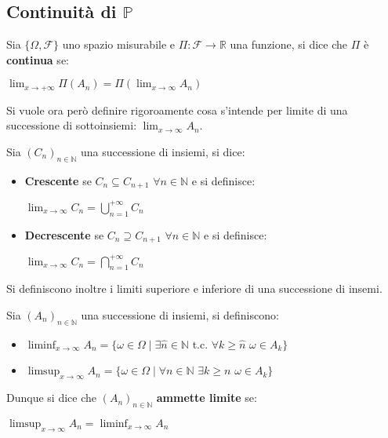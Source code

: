 \subsection{Continuità di $\mathbb{P}$}
\begin{definition}
Sia $\{\Omega, \mathscr{F}\}$ uno spazio misurabile e $\Pi:\mathscr{F}\longrightarrow\mathbb{R}$ una funzione, si dice che $\Pi$ è \textbf{continua} se:
\begin{center}
    $\lim_{x\to+\infty} \Pi(A_n)=\Pi(\lim_{x\to\infty} A_n)$
\end{center}
\end{definition}

Si vuole ora però definire rigoroamente cosa s'intende per limite di una successione di sottoinsiemi: $\lim_{x\to\infty} A_n$.

\begin{definition}
Sia $(C_n)_{n\in \mathbb{N}}$ una successione di insiemi, si dice:
\begin{itemize}
    \item \textbf{Crescente} se $C_n\subseteq C_{n+1}$ $\forall n\in\mathbb{N}$ e si definisce:
    \begin{center}
        $\lim_{x\to\infty} C_n=\bigcup\limits_{n=1}^{+\infty}C_n$
    \end{center}
    \item \textbf{Decrescente} se $C_n\supseteq C_{n+1}$ $\forall n\in\mathbb{N}$ e si definisce:
    \begin{center}
        $\lim_{x\to\infty} C_n=\bigcap\limits_{n=1}^{+\infty}C_n$
    \end{center}
\end{itemize}
\end{definition}

Si definiscono inoltre i limiti superiore e inferiore di una successione di insemi.

\begin{definition}
    Sia $(A_n)_{n\in \mathbb{N}}$ una successione di insiemi, si definiscono:
\begin{itemize}
    \item $\liminf_{x\to\infty} A_n=\{\omega\in\Omega \mid \exists\hat{n}\in\mathbb{N}$ t.c. $\forall k\geq\hat{n}$ 
    $\omega\in A_k\}$
    \item $\limsup_{x\to\infty} A_n=\{\omega\in\Omega \mid \forall n\in\mathbb{N}$  $\exists k\geq n$ 
    $\omega\in A_k\}$
\end{itemize}

Dunque si dice che $(A_n)_{n\in \mathbb{N}}$ \textbf{ammette limite} se:
\begin{center}
    $\limsup_{x\to\infty} A_n=\liminf_{x\to\infty} A_n$
\end{center}
\end{definition}


